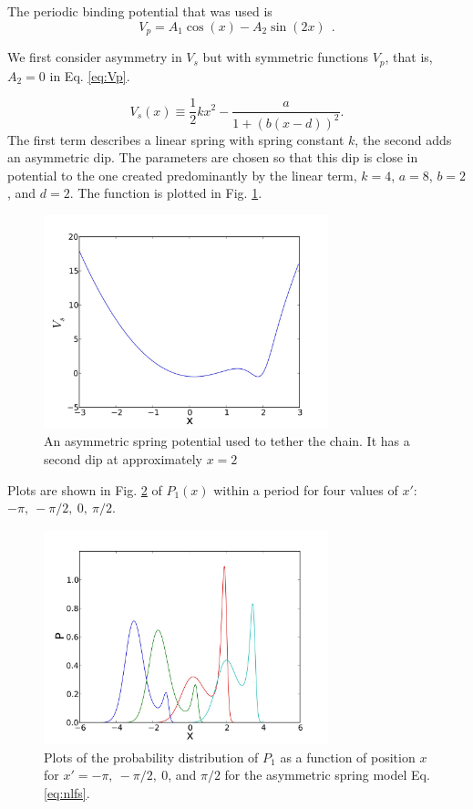 \documentclass[journal = mamobx, manuscript = article]{achemso}
\def\half{\frac{1}{2}}
\begin{document}
The periodic binding potential that was used is
\begin{equation}
\label{eq:Vp}
V_p = A_1 \cos(x) - A_2 \sin(2 x) ~~.
\end{equation}

We first consider asymmetry in $V_s$ but with symmetric functions $V_p$, that
is, $A_2 =0$ in Eq. \ref{eq:Vp}.

\begin{equation}
\label{eq:nlfs}
V_s(x) \equiv \half k x^2 - \frac{a}{1+(b (x-d))^2} .
\end{equation}
The first term describes a linear spring with spring constant $k$, the second
adds an asymmetric dip. The parameters are chosen so that this dip is close
in potential to the one created predominantly by the linear term, $k=4$, $a=8$,
$b = 2$, and $d=2$. The function is plotted in Fig. \ref{fig:vs}.

\begin{figure}[htp]
\begin{center}
\includegraphics[width=3.25in]{vs}
\caption{
An asymmetric spring potential used to tether the chain. It has a second dip at
approximately $x=2$
}
\label{fig:vs}
\end{center}
\end{figure}

Plots are shown in Fig. \ref{fig:Pnlspr} of $P_1(x)$ within a period for four values of $x'$: $-\pi,\ -\pi/2,\ 0,\ \pi/2$.

\begin{figure}[htp]
\begin{center}
\includegraphics[width=3.25in]{Pnl_spr}
\caption{
Plots of the probability distribution of $P_1$ as a function of position $x$
for $x' = -\pi,\ -\pi/2,\ 0$, and $\pi/2$ for the asymmetric spring model Eq. \ref{eq:nlfs}.
}
\label{fig:Pnlspr}
\end{center}
\end{figure}
\end{document}
